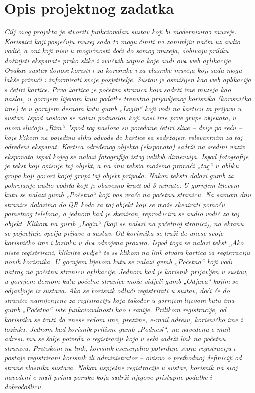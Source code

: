 \chapter{Opis projektnog zadatka}
		
		\textit{
			Cilj ovog projekta je stvoriti funkcionalan sustav koji bi modernizirao muzeje. Korisnici koji posjećuju muzej sada to mogu činiti na zanimljiv način uz audio vodič,  a oni koji nisu u mogućnosti doći do samog muzeja, dobivaju priliku doživjeti eksponate preko slika i zvučnih zapisa koje nudi ova web aplikacija.  Ovakav sustav donosi koristi i za korisnike i za vlasnike muzeja koji sada mogu lakše privući i informirati svoje posjetitelje. 
			Sustav je osmišljen kao web aplikacija s četiri kartice. Prva kartica je početna stranica koja sadrži ime muzeja kao naslov, u gornjem lijevom kutu podatke trenutno prijavljenog korisnika (korisničko ime) te u gornjem desnom kutu gumb „Login“ koji vodi na karticu za prijavu u sustav. Ispod naslova se nalazi podnaslov koji nosi ime prve grupe objekata, u ovom slučaju „Rim“. Ispod tog naslova su poredane četiri slike – dvije po redu – koje klikom na pojedinu sliku odvode do kartice sa sadržajem relevantnim za taj određeni eksponat. 
			Kartica određenog objekta (eksponata) sadrži na sredini naziv eksponata ispod kojeg se nalazi fotografija istog velikih dimenzija. Ispod fotografije je tekst koji opisuje taj objekt, a na dnu teksta možemo pronaći „tag“ u obliku grupa koji govori kojoj grupi taj objekt pripada. Nakon teksta dolazi gumb za pokretanje audio vodiča koji je obavezno kraći od 3 minute. U gornjem lijevom kutu se nalazi gumb „Početna“ koji nas vraća na početnu stranicu. Na samom dnu stranice dolazimo do QR koda za taj objekt koji se može skenirati pomoću pametnog telefona, a jednom kad je skeniran, reproducira se audio vodič za taj objekt. 
			Klikom na gumb „Login“ (koji se nalazi na početnoj stranici), na ekranu se pojavljuje opcija prijave u sustav. Od korisnika se traži da unese svoje korisničko ime i lozinku u dva odvojena prozora.  Ispod toga se nalazi tekst „Ako niste registrirani, kliknite ovdje“ te se klikom na link otvara kartica za registraciju novih korisnika. U gornjem lijevom kutu se nalazi gumb „Početna“ koji vodi natrag na početnu stranicu aplikacije. Jednom kad je korisnik prijavljen u sustav, u gornjem desnom kutu početne stranice može vidjeti gumb „Odjava“ kojim se odjavljuje iz sustava.
			Ako se korisnik odluči registrirati u sustav, doći će do stranice namijenjene za registraciju koja također u gornjem lijevom kutu ima gumb „Početna“ iste funkcionalnosti kao i ranije. Prilikom registracije, od korisnika se traži da unese redom ime, prezime, e-mail adresu, korisničko ime i lozinku. Jednom kad korisnik pritisne gumb „Podnesi“, na navedenu e-mail adresu mu se šalje potvrda o registraciji koja u sebi sadrži link na početnu stranicu. Pritiskom na link, korisnik esencijalno potvrđuje svoju registraciju i postaje registrirani korisnik ili administrator – ovisno o prethodnoj definiciji od strane vlasnika sustava. Nakon uspješne registracije u sustav, korisnik na svoj navedeni e-mail prima poruku koja sadrži njegove pristupne podatke i dobrodošlicu. 
}
